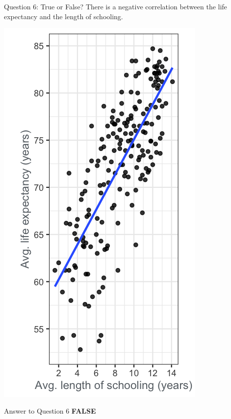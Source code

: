 \documentclass[
  ignorenonframetext,
]{beamer}
\begin{document}
\begin{frame}{Question 6: True or False?}
\label{question-6-true-or-false}
There is a negative correlation between the life expectancy and the
length of schooling.

\includegraphics{../images/im40.png}
\end{frame}

\begin{frame}{Answer to Question 6}
\label{answer-to-question-6}
\textbf{FALSE}
\end{frame}
\end{document}
